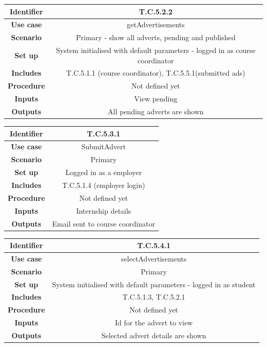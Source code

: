 \documentclass{l3deliverable}
\begin{document}
\begin{tabular}{|c|c|}
\hline \textbf{Identifier} & T.C.5.2.2 \\
\hline \textbf{Use case} & getAdvertisements\\
\hline \textbf{Scenario} & Primary - show all adverts, pending and published\\
\hline \textbf{Set up} & System initialised with default parameters - logged in as course coordinator\\
\hline \textbf{Includes} &T.C.5.1.1 (course coordinator), T.C.5.5.1(submitted ads)\\
\hline \textbf{Procedure} & Not defined yet\\
\hline \textbf{Inputs} & View pending\\
\hline \textbf{Outputs} & All pending adverts are shown\\
\hline
\end{tabular}

\begin{tabular}{|c|c|}
\hline \textbf{Identifier} & T.C.5.3.1\\
\hline \textbf{Use case} & SubmitAdvert\\
\hline \textbf{Scenario} & Primary\\
\hline \textbf{Set up} & Logged in as a employer\\
\hline \textbf{Includes} & T.C.5.1.4 (employer login)\\
\hline \textbf{Procedure} & Not defined yet\\
\hline \textbf{Inputs} & Internship details\\
\hline \textbf{Outputs} & Email sent to course coordinator\\
\hline
\end{tabular}

\begin{tabular}{|c|c|}
\hline \textbf{Identifier} & T.C.5.4.1\\
\hline \textbf{Use case} & selectAdvertisements\\
\hline \textbf{Scenario} & Primary\\
\hline \textbf{Set up} & System initialised with default parameters - logged in as student\\
\hline \textbf{Includes} & T.C.5.1.3, T.C.5.2.1\\
\hline \textbf{Procedure} & Not defined yet\\
\hline \textbf{Inputs} & Id for the advert to view\\
\hline \textbf{Outputs} & Selected advert details are shown\\
\hline
\end{tabular}
\end{document}
